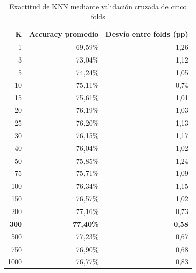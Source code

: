 \begin{table}[H]
\caption{Exactitud de KNN mediante validación cruzada de cinco folds}
\label{tab:knn_cv}
\centering
\footnotesize
\begin{tabular}{rrr}
\toprule
K & Accuracy promedio & Desvío entre folds (pp) \\
\midrule
1 & 69,59\% & 1,26 \\
3 & 73,04\% & 1,12 \\
5 & 74,24\% & 1,05 \\
10 & 75,11\% & 0,74 \\
15 & 75,61\% & 1,01 \\
20 & 76,19\% & 1,03 \\
25 & 76,20\% & 1,13 \\
30 & 76,15\% & 1,17 \\
40 & 76,04\% & 1,02 \\
50 & 75,85\% & 1,24 \\
75 & 75,71\% & 1,09 \\
100 & 76,34\% & 1,15 \\
150 & 76,57\% & 1,02 \\
200 & 77,16\% & 0,73 \\
\textbf{300} & \textbf{77,40\%} & \textbf{0,58} \\
500 & 77,23\% & 0,67 \\
750 & 76,90\% & 0,68 \\
1000 & 76,77\% & 0,83 \\
\bottomrule
\end{tabular}
\end{table}
